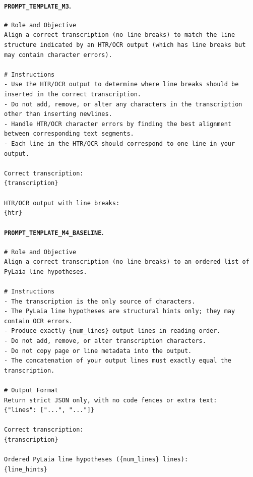 \paragraph{\texttt{PROMPT\_TEMPLATE\_M3}.}
\begin{lstlisting}[basicstyle=\scriptsize\ttfamily,breaklines=true,columns=fullflexible]
# Role and Objective
Align a correct transcription (no line breaks) to match the line structure indicated by an HTR/OCR output (which has line breaks but may contain character errors).

# Instructions
- Use the HTR/OCR output to determine where line breaks should be inserted in the correct transcription.
- Do not add, remove, or alter any characters in the transcription other than inserting newlines.
- Handle HTR/OCR character errors by finding the best alignment between corresponding text segments.
- Each line in the HTR/OCR should correspond to one line in your output.

Correct transcription:
{transcription}

HTR/OCR output with line breaks:
{htr}
\end{lstlisting}

\paragraph{\texttt{PROMPT\_TEMPLATE\_M4\_BASELINE}.}
\begin{lstlisting}[basicstyle=\scriptsize\ttfamily,breaklines=true,columns=fullflexible]
# Role and Objective
Align a correct transcription (no line breaks) to an ordered list of PyLaia line hypotheses.

# Instructions
- The transcription is the only source of characters.
- The PyLaia line hypotheses are structural hints only; they may contain OCR errors.
- Produce exactly {num_lines} output lines in reading order.
- Do not add, remove, or alter transcription characters.
- Do not copy page or line metadata into the output.
- The concatenation of your output lines must exactly equal the transcription.

# Output Format
Return strict JSON only, with no code fences or extra text:
{"lines": ["...", "..."]}

Correct transcription:
{transcription}

Ordered PyLaia line hypotheses ({num_lines} lines):
{line_hints}
\end{lstlisting}

